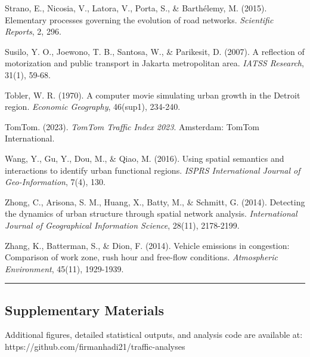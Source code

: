 Strano, E., Nicosia, V., Latora, V., Porta, S., \& Barthélemy, M. (2015). Elementary processes governing the evolution of road networks. \emph{Scientific Reports}, 2, 296.

Susilo, Y. O., Joewono, T. B., Santosa, W., \& Parikesit, D. (2007). A reflection of motorization and public transport in Jakarta metropolitan area. \emph{IATSS Research}, 31(1), 59-68.

Tobler, W. R. (1970). A computer movie simulating urban growth in the Detroit region. \emph{Economic Geography}, 46(sup1), 234-240.

TomTom. (2023). \emph{TomTom Traffic Index 2023}. Amsterdam: TomTom International.

Wang, Y., Gu, Y., Dou, M., \& Qiao, M. (2016). Using spatial semantics and interactions to identify urban functional regions. \emph{ISPRS International Journal of Geo-Information}, 7(4), 130.

Zhong, C., Arisona, S. M., Huang, X., Batty, M., \& Schmitt, G. (2014). Detecting the dynamics of urban structure through spatial network analysis. \emph{International Journal of Geographical Information Science}, 28(11), 2178-2199.

Zhang, K., Batterman, S., \& Dion, F. (2014). Vehicle emissions in congestion: Comparison of work zone, rush hour and free-flow conditions. \emph{Atmospheric Environment}, 45(11), 1929-1939.

\begin{center}\rule{0.5\linewidth}{0.5pt}\end{center}

\subsection{Supplementary Materials}\label{supplementary-materials}

Additional figures, detailed statistical outputs, and analysis code are available at: https://github.com/firmanhadi21/traffic-analyses
